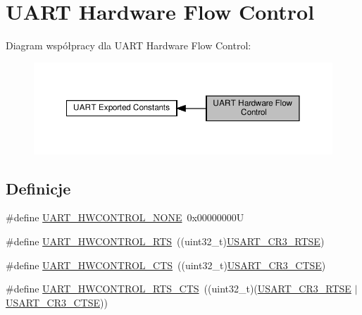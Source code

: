 \hypertarget{group___u_a_r_t___hardware___flow___control}{}\section{U\+A\+RT Hardware Flow Control}
\label{group___u_a_r_t___hardware___flow___control}
Diagram współpracy dla U\+A\+RT Hardware Flow Control\+:\nopagebreak
\begin{figure}[H]
\begin{center}
\leavevmode
\includegraphics[width=350pt]{group___u_a_r_t___hardware___flow___control}
\end{center}
\end{figure}
\subsection*{Definicje}
\begin{DoxyCompactItemize}
\item 
\#define \hyperlink{group___u_a_r_t___hardware___flow___control_gae0569001c06b7760cd38c481f84116cf}{U\+A\+R\+T\+\_\+\+H\+W\+C\+O\+N\+T\+R\+O\+L\+\_\+\+N\+O\+NE}~0x00000000U
\item 
\#define \hyperlink{group___u_a_r_t___hardware___flow___control_ga6d5dad09c6abf30f252084ba0f8c0b7d}{U\+A\+R\+T\+\_\+\+H\+W\+C\+O\+N\+T\+R\+O\+L\+\_\+\+R\+TS}~((uint32\+\_\+t)\hyperlink{group___peripheral___registers___bits___definition_ga7c5d6fcd84a4728cda578a0339b4cac2}{U\+S\+A\+R\+T\+\_\+\+C\+R3\+\_\+\+R\+T\+SE})
\item 
\#define \hyperlink{group___u_a_r_t___hardware___flow___control_ga352f517245986e3b86bc75f8472c51ea}{U\+A\+R\+T\+\_\+\+H\+W\+C\+O\+N\+T\+R\+O\+L\+\_\+\+C\+TS}~((uint32\+\_\+t)\hyperlink{group___peripheral___registers___bits___definition_gaa125f026b1ca2d76eab48b191baed265}{U\+S\+A\+R\+T\+\_\+\+C\+R3\+\_\+\+C\+T\+SE})
\item 
\#define \hyperlink{group___u_a_r_t___hardware___flow___control_ga7c91698e8f08ba7ed3f2a0ba9aa27d73}{U\+A\+R\+T\+\_\+\+H\+W\+C\+O\+N\+T\+R\+O\+L\+\_\+\+R\+T\+S\+\_\+\+C\+TS}~((uint32\+\_\+t)(\hyperlink{group___peripheral___registers___bits___definition_ga7c5d6fcd84a4728cda578a0339b4cac2}{U\+S\+A\+R\+T\+\_\+\+C\+R3\+\_\+\+R\+T\+SE} $\vert$ \hyperlink{group___peripheral___registers___bits___definition_gaa125f026b1ca2d76eab48b191baed265}{U\+S\+A\+R\+T\+\_\+\+C\+R3\+\_\+\+C\+T\+SE}))
\end{DoxyCompactItemize}


